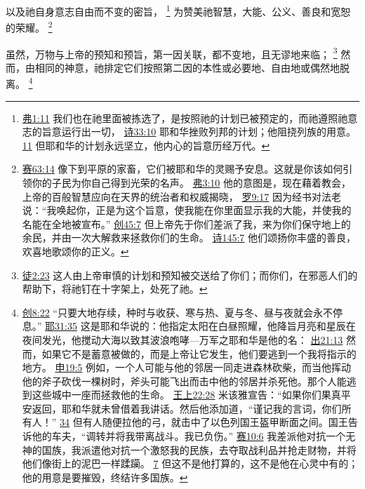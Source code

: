 \documentclass[12pt, a4paper, oneside]{ctexart}
\newcounter{parnum}[section]
\newcommand{\N}{%
   \noindent\refstepcounter{parnum}%
    \makebox[\parindent][l]{\textbf{\arabic{parnum}.}}}
\begin{document}
	以及祂自身意志自由而不变的密旨，
	\footnote {
		\href{https://biblehub.com/ephesians/1-11.htm}{弗1:11} 我们也在祂里面被拣选了，是按照祂的计划已被预定的，而祂遵照祂意志的旨意运行出一切，
		\href{https://biblehub.com/psalms/33-10.htm}{诗33:10} 耶和华挫败列邦的计划；他阻挠列族的用意。
		\href{https://biblehub.com/psalms/33-11.htm}{11} 但耶和华的计划永远坚立，他内心的旨意历经万代。
	}
	为赞美祂智慧，大能、公义、善良和宽恕的荣耀。
	\footnote {
		\href{https://biblehub.com/isaiah/63-14.htm}{赛63:14} 像下到平原的家畜，它们被耶和华的灵赐予安息。这就是你该如何引领你的子民为你自己得到光荣的名声。
		\href{https://biblehub.com/ephesians/3-10.htm}{弗3:10} 他的意图是，现在藉着教会，上帝的百般智慧应向在天界的统治者和权威揭晓，
		\href{https://biblehub.com/romans/9-17.htm}{罗9:17} 因为经书对法老说：“我唤起你，正是为这个旨意，使我能在你里面显示我的大能，并使我的名能在全地被宣布。”
		\href{https://biblehub.com/genesis/45-7.htm}{创45:7} 但上帝先于你们差派了我，来为你们保守地上的余民，并由一次大解救来拯救你们的生命。
		\href{https://biblehub.com/psalms/145-7.htm}{诗145:7} 他们颂扬你丰盛的善良，欢喜地歌颂你的正义。
	}

\N 虽然，万物与上帝的预知和预旨，第一因关联，都不变地，且无谬地来临；
	\footnote {
		\href{https://biblehub.com/acts/2-23.htm}{徒2:23} 这人由上帝审慎的计划和预知被交送给了你们；而你们，在邪恶人们的帮助下，将祂钉在十字架上，处死了祂。
	}
	然而，由相同的神意，祂排定它们按照第二因的本性或必要地、自由地或偶然地脱离。
	\footnote {
		\href{https://biblehub.com/genesis/8-22.htm}{创8:22} “只要大地存续，种时与收获、寒与热、夏与冬、昼与夜就会永不停息。”
		\href{https://biblehub.com/jeremiah/31-35.htm}{耶31:35} 这是耶和华说的：他指定太阳在白昼照耀，他降旨月亮和星辰在夜间发光，他搅动大海以致其波浪咆哮---万军之耶和华是他的名：
		\href{https://biblehub.com/exodus/21-13.htm}{出21:13} 然而，如果它不是蓄意被做的，而是上帝让它发生，他们要逃到一个我将指示的地方。
		\href{https://biblehub.com/deuteronomy/19-5.htm}{申19:5} 例如，一个人可能与他的邻居一同走进森林砍柴，而当他挥动他的斧子砍伐一棵树时，斧头可能飞出而击中他的邻居并杀死他。那个人能逃到这些城中一座而拯救他的生命。
		\href{https://biblehub.com/1_kings/22-28.htm}{王上22:28} 米该雅宣告：“如果你们果真平安返回，耶和华就未曾借着我讲话。然后他添加道，“谨记我的言词，你们所有人！”
		\href{https://biblehub.com/1_kings/22-34.htm}{34} 但有人随便拉他的弓，就击中了以色列国王盔甲断面之间。国王告诉他的车夫，“调转并将我带离战斗。我已负伤。”
		\href{https://biblehub.com/isaiah/10-6.htm}{赛10:6} 我差派他对抗一个无神的国族，我派遣他对抗一个激怒我的民族，去夺取战利品并抢走财物，并将他们像街上的泥巴一样蹂躏。
		\href{https://biblehub.com/isaiah/10-7.htm}{7} 但这不是他打算的，这不是他在心灵中有的；他的用意是要摧毁，终结许多国族。
	}
\end{document}
